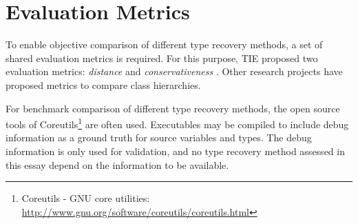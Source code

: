 
\section{Evaluation Metrics}

To enable objective comparison of different type recovery methods, a set of shared evaluation metrics is required. For this purpose, TIE proposed two evaluation metrics: \textit{distance} and \textit{conservativeness} \cite{tie_reverse_engineering_of_types}. Other research projects have proposed metrics to compare class hierarchies.

For benchmark comparison of different type recovery methods, the open source tools of Coreutils\footnote{Coreutils - GNU core utilities: \url{http://www.gnu.org/software/coreutils/coreutils.html}} are often used. Executables may be compiled to include debug information as a ground truth for source variables and types. The debug information is only used for validation, and no type recovery method assessed in this essay depend on the information to be available.




